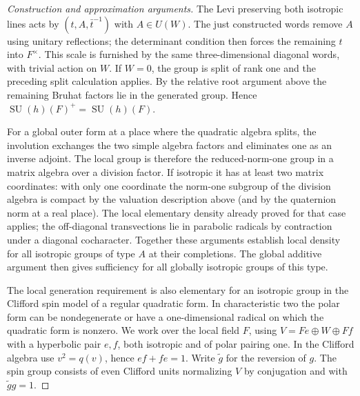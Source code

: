 \documentclass[11pt,a4paper,openany,oneside]{book}
\theoremstyle{resultstyle}
\theoremstyle{definition}
\numberwithin{equation}{chapter}
\begin{document}
\begin{proof}[Construction and approximation arguments]
The Levi preserving both isotropic lines acts by
\((t,A,\bar t^{-1})\) with \(A\in U(W)\).
The just constructed words remove \(A\) using
unitary reflections; the determinant condition
then forces the remaining \(t\) into \(F^\times\).
This scale is furnished by the same three-dimensional
diagonal words, with trivial action on \(W\).
If \(W=0\), the group is split of rank one
and the preceding split calculation applies.
By the relative root argument above the remaining
Bruhat factors lie in the generated group. Hence
\(\operatorname{SU}(h)(F)^+=\operatorname{SU}(h)(F)\).

For a global outer form at a place where the
quadratic algebra splits, the involution exchanges
the two simple algebra factors and eliminates
one as an inverse adjoint. The local group is
therefore the reduced-norm-one group in a matrix
algebra over a division factor. If isotropic it
has at least two matrix coordinates: with only
one coordinate the norm-one subgroup of the
division algebra is compact by the valuation
description above (and by the quaternion norm
at a real place). The local elementary density
already proved for that case applies; the
off-diagonal transvections lie in parabolic
radicals by contraction under a diagonal
cocharacter. Together these arguments establish
local density for all isotropic groups of type \(A\)
at their completions. The global additive argument
then gives sufficiency for all globally isotropic
groups of this type.

The local generation requirement is also elementary for
an isotropic group in the Clifford spin model of a regular
quadratic form. In characteristic two the polar form can
be nondegenerate or have a one-dimensional radical on which
the quadratic form is nonzero. We work over the local field
\(F\), using \(V=Fe\oplus W\oplus Ff\) with a hyperbolic
pair \(e,f\), both isotropic and of polar pairing one. In the Clifford algebra use
\(v^2=q(v)\), hence \(ef+fe=1\).
Write \(\widetilde g\) for the reversion of \(g\).
The spin group consists of even Clifford units normalizing
\(V\) by conjugation and with \(\widetilde g g=1\).


\end{proof}
\end{document}
